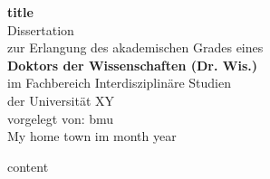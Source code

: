 \documentclass[paper=A4,              %
               twoside,               %
               12pt,                  %
               toc=listof,            %
               toc=bib,               %
               parskip=half,          %
               headsepline=true,      %
               chapterprefix=true,    %
               chapterprefix=true,    %
               bibliography=openstyle %
               ]{scrbook}
\begin{document}

\frontmatter

\begin{titlepage}
  \begin{center}
    \textbf{\Huge {{ title }}}\\
    \vspace{2cm}
    \huge Dissertation\\
    \vspace{2cm}
    \large zur Erlangung des akademischen Grades eines \\
    \vspace{1cm}
    \textbf{\Large Doktors der Wissenschaften (Dr. Wis.)} \\
    \vspace{1cm}
    \Large im Fachbereich Interdisziplinäre Studien \\
    \vspace{1cm}
    \Large der Universität XY \\
    \vspace{4cm}
    \large vorgelegt von: bmu \\
    \vspace{2cm}
    \large My home town im {{ month }} {{ year }}
  \end{center}
\end{titlepage}


\tableofcontents

\listoffigures

\listoftables

\mainmatter

{{content}}

\backmatter

\printbibliography

\renewcommand{\indexname}{Stichwortverzeichnis}
\printindex
\end{document}
